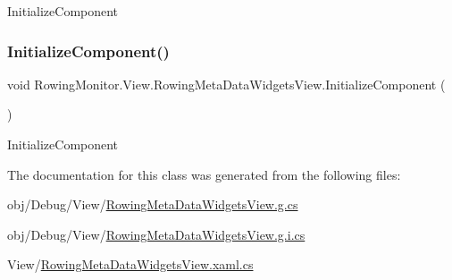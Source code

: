 Initialize\+Component 

\mbox{\label{class_rowing_monitor_1_1_view_1_1_rowing_meta_data_widgets_view_a156acf6faf9d7cd9925d2e164052d3d6}} 
\subsubsection{\texorpdfstring{Initialize\+Component()}{InitializeComponent()}\hspace{0.1cm}{\footnotesize\ttfamily [4/4]}}
{\footnotesize\ttfamily void Rowing\+Monitor.\+View.\+Rowing\+Meta\+Data\+Widgets\+View.\+Initialize\+Component (\begin{DoxyParamCaption}{ }\end{DoxyParamCaption})}



Initialize\+Component 



The documentation for this class was generated from the following files\+:\begin{DoxyCompactItemize}
\item 
obj/\+Debug/\+View/\hyperlink{_debug_2_view_2_rowing_meta_data_widgets_view_8g_8cs}{Rowing\+Meta\+Data\+Widgets\+View.\+g.\+cs}\item 
obj/\+Debug/\+View/\hyperlink{_debug_2_view_2_rowing_meta_data_widgets_view_8g_8i_8cs}{Rowing\+Meta\+Data\+Widgets\+View.\+g.\+i.\+cs}\item 
View/\hyperlink{_rowing_meta_data_widgets_view_8xaml_8cs}{Rowing\+Meta\+Data\+Widgets\+View.\+xaml.\+cs}\end{DoxyCompactItemize}
